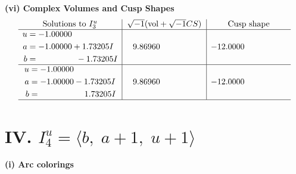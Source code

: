 \documentclass[1p]{elsarticle_modified}
\theoremstyle{definition}
\newcommand{\I}{\sqrt{-1}}
\begin{document}
\newpage\flushleft \textbf{(vi) Complex Volumes and Cusp Shapes}
$$\begin{array}{c|c|c}  
\text{Solutions to }I^u_{3}& \I (\text{vol} + \sqrt{-1}CS) & \text{Cusp shape}\\
 \hline 
\begin{aligned}
u &= -1.00000\phantom{ +0.000000I} \\
a &= -1.00000 + 1.73205 I \\
b &= \phantom{-0.000000 } -1.73205 I\end{aligned}
 & \phantom{-}9.86960\phantom{ +0.000000I} & -12.0000\phantom{ +0.000000I} \\ \hline\begin{aligned}
u &= -1.00000\phantom{ +0.000000I} \\
a &= -1.00000 - 1.73205 I \\
b &= \phantom{-0.000000 -}1.73205 I\end{aligned}
 & \phantom{-}9.86960\phantom{ +0.000000I} & -12.0000\phantom{ +0.000000I}\\
 \hline 
 \end{array}$$\newpage\newpage\renewcommand{\arraystretch}{1}
\centering \section*{IV. $I^u_{4}= \langle b,\;a+1,\;u+1 \rangle$}
\flushleft \textbf{(i) Arc colorings}\\
\end{document}
